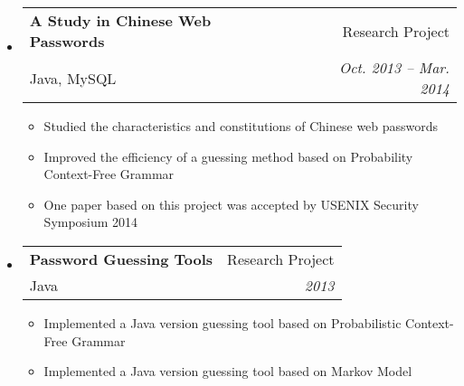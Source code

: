 \documentclass[letterpaper,10pt]{article}
\makeatletter
\newcommand{\resitem}[1]{\item #1 \vspace{-2pt}}
\newcommand{\ressubheading}[4]{
\begin{tabular*}{6.5in}{l@{\extracolsep{\fill}}r}
		\textbf{#1} & #2 \\
		#3 & #4 \\
\end{tabular*}\vspace{-6pt}}
\makeatother
\begin{document}
	\begin{itemize}
		\item
			\ressubheading{A Study in Chinese Web Passwords}{Research Project}{Java, MySQL}{\emph{Oct. 2013 -- Mar. 2014}}
			{\begin{itemize}
				\resitem{Studied the characteristics and constitutions of Chinese web passwords}
                \resitem{Improved the efficiency of a guessing method based on Probability Context-Free Grammar}
				\resitem{One paper based on this project was accepted by USENIX Security Symposium 2014}
			\end{itemize}}
	\end{itemize}
			
	\begin{itemize}
		\item
			\ressubheading{Password Guessing Tools}{Research Project}{Java}{\emph{2013}}
			{\begin{itemize}
				\resitem{Implemented a Java version guessing tool based on Probabilistic Context-Free Grammar}
                \resitem{Implemented a Java version guessing tool based on Markov Model}
			\end{itemize}
			}	
	\end{itemize}



\end{document}
